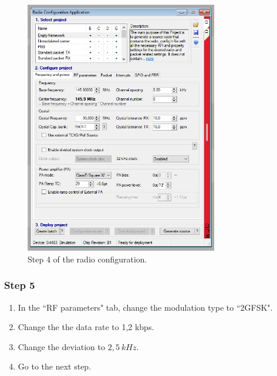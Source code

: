 \begin{figure}[!h]
	\begin{center}
		\includegraphics[width=0.75\textwidth]{figures/wds-tutorial-4.png}
		\caption{Step 4 of the radio configuration.}
		\label{fig:wds-tutorial-step-4}
	\end{center}
\end{figure}

\subsubsection{Step 5}

\begin{enumerate}
    \item In the ``RF parameters" tab, change the modulation type to ``2GFSK".
    \item Change the the data rate to 1,2 kbps.
    \item Change the deviation to $2,5\ kHz$.
    \item Go to the next step.
\end{enumerate}

